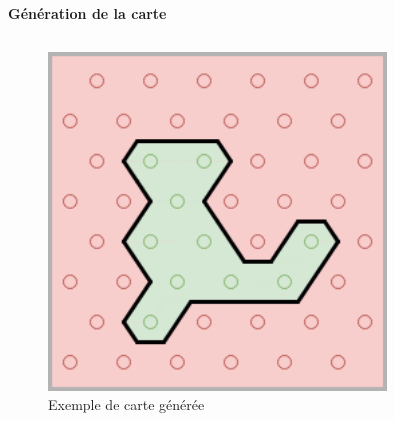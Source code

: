 \documentclass[aspectratio=169,10pt]{beamer}
\begin{document}
\begin{frame}{\textbf{Génération de la carte}}
\begin{columns}[t]
\begin{column}{0.33\textwidth}
\begin{figure}
				\includegraphics[width=0.8\textwidth]{IMAGES/map_generation_example.png}
				\caption{Exemple de carte générée}
				\label{fig:map_generation_step2}
			\end{figure}
		\end{column}
	\end{columns}
\end{frame}
\end{document}
